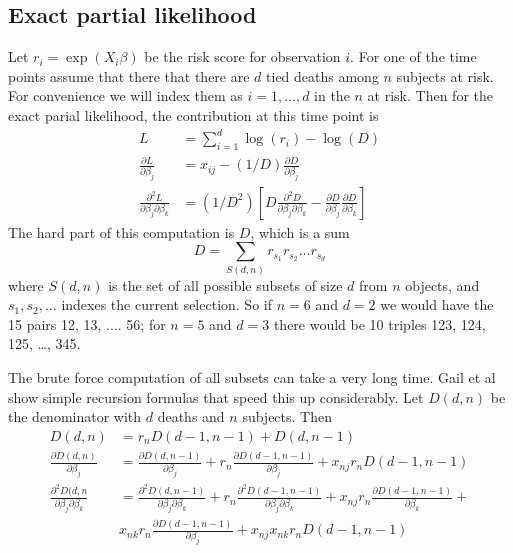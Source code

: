 \documentclass{article}
\begin{document}
\subsection{Exact partial likelihood}
Let $r_i = \exp(X_i\beta)$ be the risk score for observation $i$.
For one of the time points assume that there that there are $d$ 
tied deaths among $n$ subjects at risk.  
For convenience we will index them as $i= 1,\ldots,d$ in the $n$ at risk.
Then for the exact parial likelihood, the contribution at this time point
is
\begin{align*}
  L &= \sum_{i=1}^d \log(r_i) - \log(D) \\
  \frac{\partial L}{\partial \beta_j} &= x_{ij} - (1/D)  
               \frac{\partial D}{\partial \beta_j} \\
  \frac{\partial^2 L}{\partial \beta_j \partial \beta_k} &=
  (1/D^2)\left[D\frac{\partial^2D}{\partial \beta_j \partial \beta_k} -
      \frac{\partial D}{\partial \beta_j}\frac{\partial D}{\partial \beta_k}
       \right]
\end{align*}
The hard part of this computation is $D$, which is a sum
\begin{equation*}
  D = \sum_{S(d,n)} r_{s_1}r_{s_2} \ldots r_{s_d}
\end{equation*}
where $S(d,n)$ is the set of all possible subsets of size $d$ from $n$
objects, and $s_1, s_2, \ldots$ indexes the current selection.
So if $n=6$ and $d=2$ we would have the 15 pairs 12, 13, .... 56;
for $n=5$ and $d=3$ there would be 10 triples 123, 124, 125, \ldots, 345.

The brute force computation of all subsets can take a very long time.
Gail et al \cite{Gail81} show simple recursion formulas that speed
this up considerably.  Let $D(d,n)$ be the denominator with $d$
deaths and $n$ subjects.  Then
\begin{align}
  D(d,n) &= r_nD(d-1, n-1) + D(d, n-1)  \label{d0}\\
  \frac{\partial D(d,n)}{\partial \beta_j} &=
      \frac{\partial D(d, n-1)}{\partial \beta_j} +
      r_n \frac{\partial D(d-1, n-1)}{\partial \beta_j} +
      x_{nj}r_n D(d-1, n-1) \label{d1}\\
 \frac{\partial^2D(d,n}{\partial \beta_j \partial \beta_k} &=
   \frac{\partial^2D(d,n-1)}{\partial \beta_j \partial \beta_k} +
     r_n\frac{\partial^2D(d-1,n-1)}{\partial \beta_j \partial \beta_k} +
     x_{nj}r_n\frac{\partial D(d-1, n-1)}{\partial \beta_k} + \nonumber \\
     &  x_{nk}r_n\frac{\partial D(d-1, n-1)}{\partial \beta_j} +
      x_{nj}x_{nk}r_n D(d-1, n-1) \label{d2}
\end{align}
\end{document}
